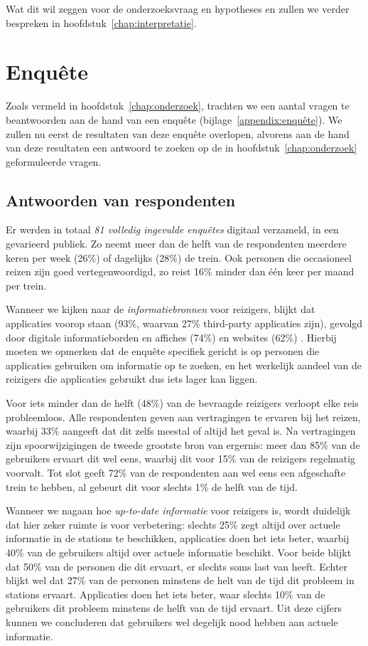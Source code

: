 Wat dit wil zeggen voor de onderzoeksvraag en hypotheses en zullen we verder bespreken in hoofdstuk~\ref{chap:interpretatie}.

\section{Enquête}
Zoals vermeld in hoofdstuk~\ref{chap:onderzoek}, trachten we een aantal vragen te beantwoorden aan de hand van een enquête (bijlage~\ref{appendix:enquête}). We zullen nu eerst de resultaten van deze enquête overlopen, alvorens aan de hand van deze resultaten een antwoord te zoeken op de in hoofdstuk~\ref{chap:onderzoek} geformuleerde vragen.

\subsection{Antwoorden van respondenten}
Er werden in totaal \emph{81 volledig ingevulde enquêtes} digitaal verzameld, in een gevarieerd publiek. Zo neemt meer dan de helft van de respondenten meerdere keren per week (26\%) of dagelijks (28\%) de trein. Ook personen die occasioneel reizen zijn goed vertegenwoordigd, zo reist 16\% minder dan één keer per maand per trein.

Wanneer we kijken naar de \emph{informatiebronnen} voor reizigers, blijkt dat  applicaties voorop staan (93\%, waarvan 27\% third-party applicaties zijn), gevolgd door digitale informatieborden en affiches (74\%) en websites (62\%) . Hierbij moeten we opmerken dat de enquête specifiek gericht is op personen die applicaties gebruiken om informatie op te zoeken, en het werkelijk aandeel van de reizigers die applicaties gebruikt dus iets lager kan liggen.

Voor iets minder dan de helft (48\%) van de bevraagde reizigers verloopt elke reis probleemloos. Alle respondenten geven aan vertragingen te ervaren bij het reizen, waarbij 33\% aangeeft dat dit zelfs meestal of altijd het geval is. Na vertragingen zijn spoorwijzigingen de tweede grootste bron van ergernis: meer dan 85\% van de gebruikers ervaart dit wel eens, waarbij dit voor 15\% van de reizigers regelmatig voorvalt. Tot slot geeft 72\% van de respondenten aan wel eens een afgeschafte trein te hebben, al gebeurt dit voor slechts 1\% de helft van de tijd.

Wanneer we nagaan hoe \emph{up-to-date informatie} voor reizigers is, wordt duidelijk dat hier zeker ruimte is voor verbetering: slechts 25\% zegt altijd over actuele informatie in de stations te beschikken, applicaties doen het iets beter, waarbij 40\% van de gebruikers altijd over actuele informatie beschikt. Voor beide blijkt dat 50\% van de personen die dit ervaart, er slechts soms last van heeft. Echter blijkt wel dat 27\% van de personen minstens de helt van de tijd dit probleem in stations ervaart. Applicaties doen het iets beter, waar slechts 10\% van de gebruikers dit probleem minstens de helft van de tijd ervaart. Uit deze cijfers kunnen we concluderen dat gebruikers wel degelijk nood hebben aan actuele informatie. 

